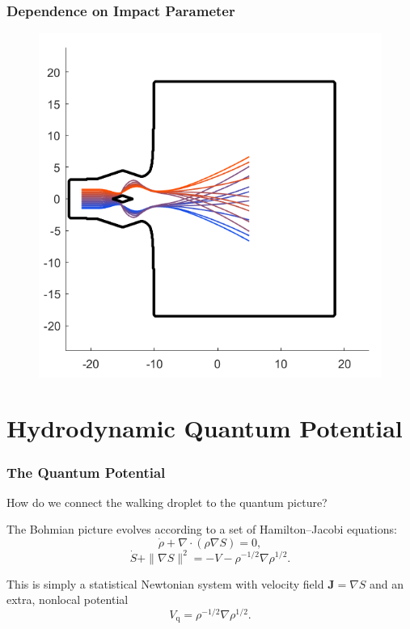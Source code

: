 \documentclass[compress,10pt,usenames,dvipsnames]{beamer}
\theoremstyle{remark}
\begin{document}
\begin{frame}\frametitle{Dependence on Impact Parameter}
	\begin{figure}
		\centering
		\includegraphics[scale=0.4]{Figures/array.png}
	\end{figure}
\end{frame}

\section{Hydrodynamic Quantum Potential}

\begin{frame}\frametitle{The Quantum Potential}
	How do we connect the walking droplet to the quantum picture?
	\bigskip
	\pause
	
	The Bohmian picture evolves according to a set of Hamilton--Jacobi equations:
	\[\dot{\rho} + \nabla\cdot(\rho\nabla S) = 0,\]
	\[\dot{S} + \|\nabla S\|^2 = -V - \rho^{-1/2}\nabla\rho^{1/2}.\]
	\smallskip
	\pause
	
	This is simply a statistical Newtonian system with velocity field $\mathbf{J}=\nabla S$ and an extra, nonlocal potential
	\[V_\text{q} = \rho^{-1/2}\nabla\rho^{1/2}.\]
\end{frame}
\end{document}
